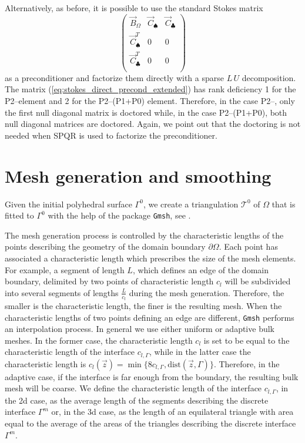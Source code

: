 Alternatively, as before, it is possible to use the standard Stokes matrix
\begin{equation}\label{eq:stokes_direct_precond_extended}
\begin{pmatrix}
\vec B_\Omega & \vec C_\spadesuit & \vec C_\clubsuit \\
\vec C^T_\spadesuit & 0 & 0 \\
\vec C^T_\clubsuit & 0 & 0 \\
\end{pmatrix}
\end{equation}
as a preconditioner and factorize them directly with a sparse $L\,U$
decomposition. The matrix (\ref{eq:stokes_direct_precond_extended}) has rank
deficiency 1 for the P2--\pdg element and 2 for the P2--(P1+P0) element.
Therefore, in the case P2--\pdg, only the first null diagonal matrix is
doctored while, in the case P2--(P1+P0), both null diagonal matrices are
doctored. Again, we point out that the doctoring is not needed when SPQR is used
to factorize the preconditioner.

\section{Mesh generation and smoothing}\label{sec:stokes_smoothing}
Given the initial polyhedral surface $\Gamma^0$, we create a triangulation
$\mathcal{T}^0$ of $\Omega$ that is fitted to $\Gamma^0$ with the help of the
package \verb|Gmsh|, see \cite{GeuzaineR09}.

The mesh generation process is controlled by the characteristic lengths of the
points describing the geometry of the domain boundary $\partial\Omega$. Each
point has associated a characteristic length which prescribes the size of the
mesh elements. For example, a segment of length $L$, which defines an edge of
the domain boundary, delimited by two points of characteristic length $c_l$ will
be subdivided into several segments of lengths $\frac{L}{c_l}$ during the mesh
generation. Therefore, the smaller is the characteristic length, the finer is
the resulting mesh. When the characteristic lengths of two points defining an
edge are different, \verb|Gmsh| performs an interpolation process. In general we
use either uniform or adaptive bulk meshes. In the former case, the
characteristic length $c_l$ is set to be equal to the characteristic length of
the interface $c_{l,\Gamma}$, while in the latter case the characteristic
length is $c_l(\vec z)=\min\{8c_{l,\Gamma},\mbox{dist}(\vec z,\Gamma)\}$.
Therefore, in the adaptive case, if the interface is far enough from the
boundary, the resulting bulk mesh will be coarse. We define the characteristic
length of the interface $c_{l,\Gamma}$, in the 2d case, as the average length
of the segments describing the discrete interface $\Gamma^m$ or, in the 3d
case, as the length of an equilateral triangle with area equal to the average
of the areas of the triangles describing the discrete interface $\Gamma^m$.

